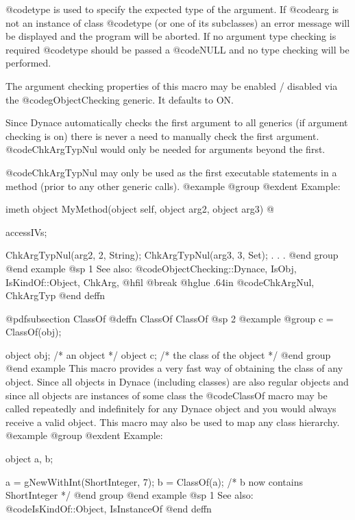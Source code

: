{{{@code{type} is used to specify the expected type of the argument.  If
@code{arg} is not an instance of class @code{type} (or one of its
subclasses) an error message will be displayed and the program will be
aborted.  If no argument type checking is required @code{type} should
be passed a @code{NULL} and no type checking will be performed.

The argument checking properties of this macro may be enabled / disabled
via the @code{gObjectChecking} generic.  It defaults to ON.

Since Dynace automatically checks the first argument to all generics (if
argument checking is on) there is never a need to manually check the
first argument.  @code{ChkArgTypNul} would only be needed for arguments
beyond the first.

@code{ChkArgTypNul} may only be used as the first executable statements in a
method (prior to any other generic calls).
@example
@group
@exdent Example:

imeth object  MyMethod(object self, object arg2, object arg3)
@{
        accessIVs;

        ChkArgTypNul(arg2, 2, String);
        ChkArgTypNul(arg3, 3, Set);
        .
        .
        .
@end group
@end example
@sp 1
See also:  @code{ObjectChecking::Dynace, IsObj, IsKindOf::Object, ChkArg,}
@hfil @break @hglue .64in @code{ChkArgNul, ChkArgTyp}
@end deffn














@pdfsubsection {ClassOf}
@deffn {ClassOf} ClassOf
@sp 2
@example
@group
c = ClassOf(obj);

object  obj;    /*  an object                   */
object  c;      /*  the class of the object     */
@end group
@end example
This macro provides a very fast way of obtaining the class of any object.
Since all objects in Dynace (including classes) are also regular objects and
since all objects are instances of some class the @code{ClassOf} macro
may be called repeatedly and indefinitely for any Dynace object and you
would always receive a valid object.  This macro may also be used to
map any class hierarchy.
@example
@group
@exdent Example:

object  a, b;

a = gNewWithInt(ShortInteger, 7);
b = ClassOf(a);   /*  b now contains ShortInteger  */
@end group
@end example
@sp 1
See also:  @code{IsKindOf::Object, IsInstanceOf}
@end deffn





}}}}
